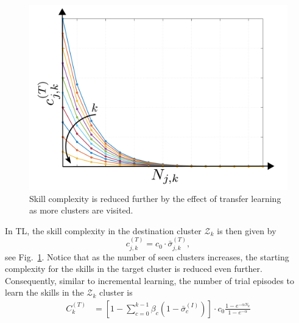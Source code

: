 \begin{figure}[!h]
	\centering
	\includegraphics[width=0.99\columnwidth]{fig/single_transfer_complexity.pdf}
	\caption{Skill complexity is reduced further by the effect of transfer learning as more clusters are visited.}
	\label{fig:single_transfer_complexity}
\end{figure}
In TL, the skill complexity in the destination cluster $\mathcal{Z}_k$ is then given by
\begin{equation}
	c^{(T)}_{j,k} = c_0 \cdot \bar{\sigma}^{(T)}_{j,k},
\end{equation}
see Fig.~\ref{fig:single_transfer_complexity}. Notice that as the number of seen clusters increases, the starting complexity for the skills in the target cluster is reduced even further. Consequently, similar to incremental learning, the number of trial episodes to learn the skills in the $\mathcal{Z}_k$ cluster is
\begin{align}\label{eq:complexity_transfer_single}
	C_{k}^{(T)} &= \left[1 - \sum_{c=0}^{k-1}\beta_{c} \left(1-\bar{\sigma}^{(I)}_{c}\right)\right]  \cdot  c_0 \frac{1 - e^{-\alpha N_k}}{1 - e^{-\alpha}}
\end{align}

